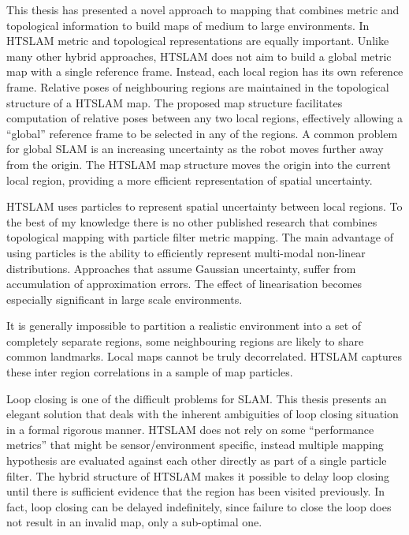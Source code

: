 This thesis has presented a novel approach to mapping that combines
metric and topological information to build maps of medium to large
environments. In HTSLAM metric and topological representations are
equally important. Unlike many other hybrid approaches, HTSLAM does
not aim to build a global metric map with a single reference
frame. Instead, each local region has its own reference
frame. Relative poses of neighbouring regions are maintained in the
topological structure of a HTSLAM map. The proposed map structure
facilitates computation of relative poses between any two local
regions, effectively allowing a ``global'' reference frame to be
selected in any of the regions. A common problem for global SLAM is an
increasing uncertainty as the robot moves further away from the
origin. The HTSLAM map structure moves the origin into the current local
region, providing a more efficient representation of spatial
uncertainty.

HTSLAM uses particles to represent spatial uncertainty between local
regions. To the best of my knowledge there is no other published
research that combines topological mapping with particle filter metric
mapping. The main advantage of using particles is the ability to
efficiently represent multi-modal non-linear distributions. Approaches
that assume Gaussian uncertainty, suffer from accumulation of
approximation errors. The effect of linearisation becomes especially
significant in large scale environments. 

It is generally impossible to partition a realistic environment into a
set of completely separate regions, some neighbouring regions are
likely to share common landmarks. Local maps cannot be truly
decorrelated. HTSLAM captures these inter region correlations in a
sample of map particles.


Loop closing is one of the difficult problems for SLAM. This thesis
presents an elegant solution that deals with the inherent ambiguities
of loop closing situation in a formal rigorous manner. HTSLAM does not
rely on some ``performance metrics'' that might be sensor/environment
specific, instead multiple mapping hypothesis are evaluated against
each other directly as part of a single particle filter. The hybrid
structure of HTSLAM makes it possible to delay loop closing until
there is sufficient evidence that the region has been visited
previously. In fact, loop closing can be delayed indefinitely, since
failure to close the loop does not result in an invalid map, only a
sub-optimal one.


